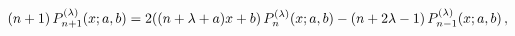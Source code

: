 \[(n+1)\mathop{P^{(\lambda)}_{n+1}\/}\nolimits\!\left(x;a,b\right)={2((n+\lambda%
+a)x+b)}\mathop{P^{(\lambda)}_{n}\/}\nolimits\!\left(x;a,b\right)-{(n+2\lambda%
-1)}\mathop{P^{(\lambda)}_{n-1}\/}\nolimits\!\left(x;a,b\right),\]